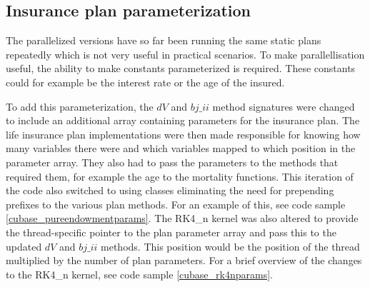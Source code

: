 \begin{table}[h!]
\centering
{}
\caption{F\# Alea.cuBase calculations per ms with double precision\label{table:cubaseManualdoubletime}}
\end{table}

\subsection{Insurance plan parameterization}\label{sub:manual_parameterization}
The parallelized versions have so far been running the same static plans repeatedly which is not very useful in practical scenarios.
To make parallellisation useful, the ability to make constants parameterized is required.
These constants could for example be the interest rate or the age of the insured.

To add this parameterization, the $dV$ and $bj\_ii$ method signatures were changed to include an additional array containing parameters for the insurance plan.
The life insurance plan implementations were then made responsible for knowing how many variables there were and which variables mapped to which position in the parameter array. 
They also had to pass the parameters to the methods that required them, for example the age to the mortality functions.
This iteration of the code also switched to using classes eliminating the need for prepending prefixes to the various plan methods.
For an example of this, see code sample \ref{cubase_pureendowmentparams}.
The RK4\_n kernel was also altered to provide the thread-specific pointer to the plan parameter array and pass this to the updated $dV$ and $bj\_ii$ methods.
This position would be the position of the thread multiplied by the number of plan parameters.
For a brief overview of the changes to the RK4\_n kernel, see code sample \ref{cubase_rk4nparams}.

